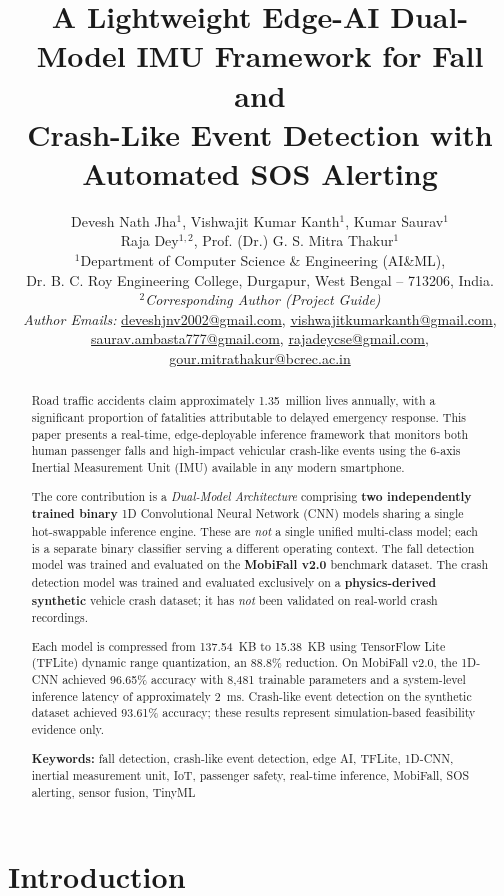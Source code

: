 \documentclass[12pt,a4paper]{article}
\title{\textbf{A Lightweight Edge-AI Dual-Model IMU Framework for Fall and\\
Crash-Like Event Detection with Automated SOS Alerting}}
\author{
  Devesh Nath Jha$^{1}$,\quad
  Vishwajit Kumar Kanth$^{1}$,\quad
  Kumar Saurav$^{1}$\\[3pt]
  Raja Dey$^{1,2}$,\quad
  Prof. (Dr.) G. S. Mitra Thakur$^{1}$\\[10pt]
  \small $^{1}$Department of Computer Science \& Engineering (AI\&ML),\\
  \small Dr. B. C. Roy Engineering College, Durgapur, West Bengal -- 713206, India.\\[5pt]
  \small $^{2}$\textit{Corresponding Author (Project Guide)}\\[10pt]
  \small \textit{Author Emails:} \url{deveshjnv2002@gmail.com}, \url{vishwajitkumarkanth@gmail.com},\\
  \small \url{saurav.ambasta777@gmail.com}, \url{rajadeycse@gmail.com},\\
  \small \url{gour.mitrathakur@bcrec.ac.in}
}
\date{}
\begin{document}
\maketitle

\begin{abstract}
Road traffic accidents claim approximately 1.35~million lives annually,
with a significant proportion of fatalities attributable to delayed emergency
response. This paper presents a real-time, edge-deployable inference framework
that monitors both human passenger falls and high-impact vehicular crash-like
events using the 6-axis Inertial Measurement Unit (IMU) available in any
modern smartphone.

The core contribution is a \textit{Dual-Model Architecture} comprising
\textbf{two independently trained binary} 1D Convolutional Neural Network
(CNN) models sharing a single hot-swappable inference engine. These are
\emph{not} a single unified multi-class model; each is a separate binary
classifier serving a different operating context. The fall detection model was
trained and evaluated on the \textbf{MobiFall v2.0} benchmark dataset.
The crash detection model was trained and evaluated exclusively on a
\textbf{physics-derived synthetic} vehicle crash dataset; it has
\emph{not} been validated on real-world crash recordings.

Each model is compressed from 137.54~KB to 15.38~KB using TensorFlow Lite
(TFLite) dynamic range quantization, an 88.8\% reduction. On MobiFall v2.0,
the 1D-CNN achieved 96.65\% accuracy with 8,481 trainable parameters and a
system-level inference latency of approximately 2~ms. Crash-like event
detection on the synthetic dataset achieved 93.61\% accuracy; these results
represent simulation-based feasibility evidence only.

\noindent\textbf{Keywords:} fall detection, crash-like event detection, edge AI,
TFLite, 1D-CNN, inertial measurement unit, IoT, passenger safety,
real-time inference, MobiFall, SOS alerting, sensor fusion, TinyML
\end{abstract}

\newpage
\tableofcontents
\newpage

\section{Introduction}
\label{sec:intro}
\end{document}
